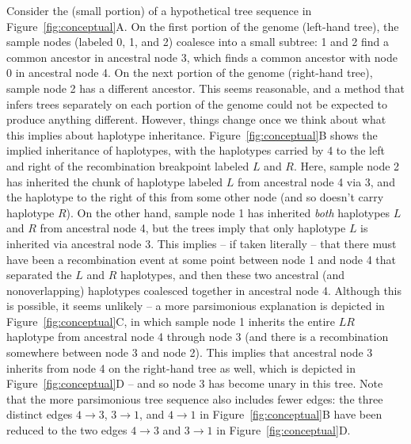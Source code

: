 \documentclass[10pt,twoside,lineno]{gsajnl}
\begin{document}
Consider the (small portion) of a hypothetical tree sequence in Figure~\ref{fig:conceptual}A.
On the first portion of the genome (left-hand tree), the sample nodes (labeled 0, 1, and 2)
coalesce into a small subtree: 1 and 2 find a common ancestor in ancestral node 3,
which finds a common ancestor with node 0 in ancestral node 4.
On the next portion of the genome (right-hand tree), sample node 2 has a different ancestor.
This seems reasonable, and a method that infers trees separately on each portion of the genome
could not be expected to produce anything different.
However, things change once we think about what this implies about haplotype inheritance.
Figure~\ref{fig:conceptual}B shows the implied inheritance of haplotypes,
with the haplotypes carried by 4 to the left and right of the recombination breakpoint labeled $L$ and $R$.
Here, sample node 2 has inherited the chunk of haplotype labeled $L$ from ancestral node 4 via 3,
and the haplotype to the right of this from some other node (and so doesn't carry haplotype $R$).
On the other hand, sample node 1 has inherited \emph{both} haplotypes $L$ and $R$
from ancestral node 4, but the trees imply that only haplotype $L$ is inherited via ancestral node 3.
This implies -- if taken literally -- that there must have been a recombination event
at some point between node 1 and node 4 that separated the $L$ and $R$ haplotypes,
and then these two ancestral (and nonoverlapping) haplotypes coalesced together in ancestral node 4.
Although this is possible, it seems unlikely --
a more parsimonious explanation is depicted in Figure~\ref{fig:conceptual}C,
in which sample node 1 inherits the entire $LR$ haplotype from ancestral node 4 through node 3
(and there is a recombination somewhere between node 3 and node 2).
This implies that ancestral node 3 inherits from node 4 on the right-hand tree as well,
which is depicted in Figure~\ref{fig:conceptual}D --
and so node 3 has become unary in this tree.
Note that the more parsimonious tree sequence also includes fewer edges:
the three distinct edges $4 \to 3$, $3 \to 1$, and $4 \to 1$ in Figure~\ref{fig:conceptual}B
have been reduced to the two edges
$4 \to 3$ and $3 \to 1$ in Figure~\ref{fig:conceptual}D.
\end{document}
